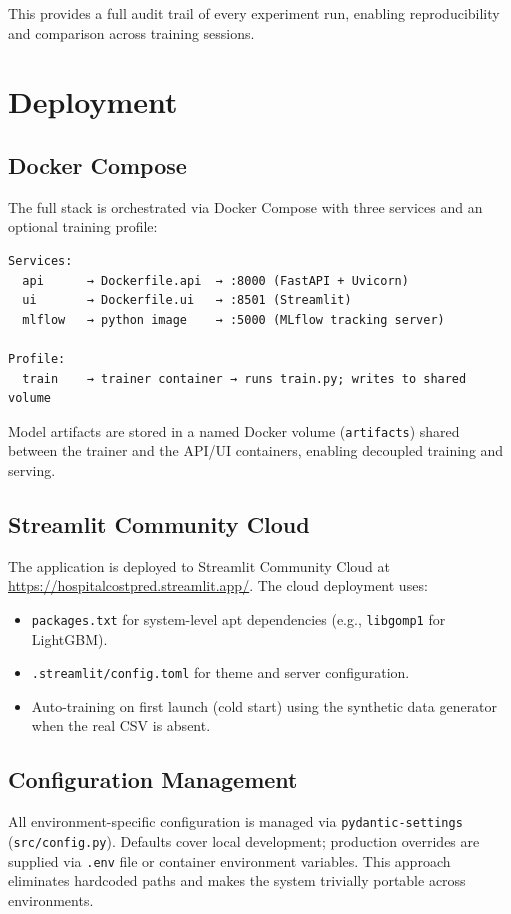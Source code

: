 \documentclass[11pt,a4paper]{article}
\begin{document}
This provides a full audit trail of every experiment run, enabling reproducibility and comparison across training sessions.

\section{Deployment}
\subsection{Docker Compose}
The full stack is orchestrated via Docker Compose with three services and an optional training profile:
\begin{verbatim}
Services:
  api      → Dockerfile.api  → :8000 (FastAPI + Uvicorn)
  ui       → Dockerfile.ui   → :8501 (Streamlit)
  mlflow   → python image    → :5000 (MLflow tracking server)

Profile:
  train    → trainer container → runs train.py; writes to shared volume
\end{verbatim}

Model artifacts are stored in a named Docker volume (\texttt{artifacts}) shared between the trainer and the API/UI containers, enabling decoupled training and serving.

\subsection{Streamlit Community Cloud}
The application is deployed to Streamlit Community Cloud at \url{https://hospitalcostpred.streamlit.app/}. The cloud deployment uses:
\begin{itemize}
  \item \texttt{packages.txt} for system-level apt dependencies (e.g., \texttt{libgomp1} for LightGBM).
  \item \texttt{.streamlit/config.toml} for theme and server configuration.
  \item Auto-training on first launch (cold start) using the synthetic data generator when the real CSV is absent.
\end{itemize}

\subsection{Configuration Management}
All environment-specific configuration is managed via \texttt{pydantic-settings} (\texttt{src/config.py}). Defaults cover local development; production overrides are supplied via \texttt{.env} file or container environment variables. This approach eliminates hardcoded paths and makes the system trivially portable across environments.
\end{document}
